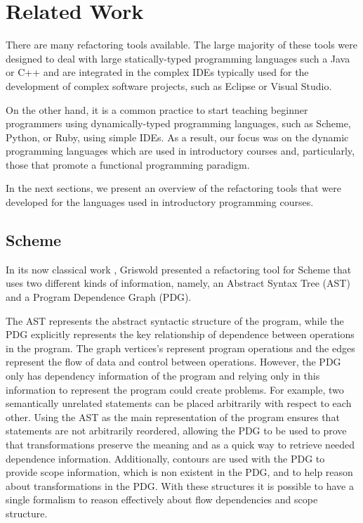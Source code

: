 \section{Related Work}
\label{sec:Related-Work}

There are many refactoring tools available.  The large majority of
these tools were designed to deal with large statically-typed
programming languages such a Java or C++ and are integrated in the
complex IDEs typically used for the development of complex software
projects, such as Eclipse or Visual Studio.

On the other hand, it is a common practice to start teaching beginner
programmers using dynamically-typed programming languages, such as
Scheme, Python, or Ruby, using simple IDEs.  As a result, our focus
was on the dynamic programming languages which are used in
introductory courses and, particularly, those that promote a
functional programming paradigm.

In the next sections, we present an overview of the refactoring tools
that were developed for the languages used in introductory programming
courses.

\subsection{Scheme}

In its now classical work \cite{griswold1991program}, Griswold
presented a refactoring tool for Scheme that uses two different kinds
of information, namely, an Abstract Syntax Tree (AST) and a Program
Dependence Graph (PDG).

The AST represents the abstract syntactic structure of the program,
while the PDG explicitly represents the key relationship of dependence
between operations in the program. %
The graph vertices's represent program operations and the edges
represent the flow of data and control between operations.  However,
the PDG only has dependency information of the program and relying
only in this information to represent the program could create
problems.  For example, two semantically unrelated statements can be
placed arbitrarily with respect to each other.  Using the AST as the
main representation of the program ensures that statements are not
arbitrarily reordered, allowing the PDG to be used to prove that
transformations preserve the meaning and as a quick way to retrieve
needed dependence information.  Additionally, contours are used with
the PDG to provide scope information, which is non existent in the
PDG, and to help reason about transformations in the PDG.
With these structures it is possible to have a single formalism to
reason effectively about flow dependencies and scope structure.


